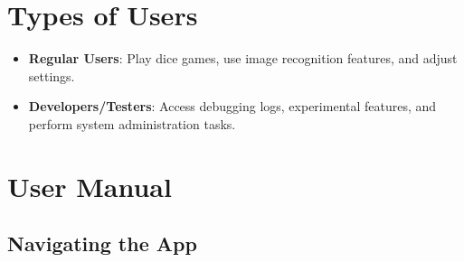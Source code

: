 \section{Types of Users}
\begin{itemize}
    \item \textbf{Regular Users}: Play dice games, use image recognition features, and adjust settings.
    \item \textbf{Developers/Testers}: Access debugging logs, experimental features, and perform system administration tasks.
\end{itemize}

\section{User Manual}
\label{sec:user_manual}

\subsection{Navigating the App}

